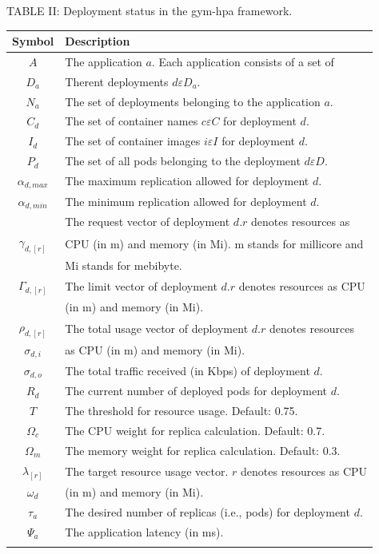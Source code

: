\documentclass[10pt]{article}
\begin{document}
TABLE II: Deployment status in the gym-hpa framework.

\begin{center}
\begin{tabular}{|c|l|}
\hline
Symbol & Description \\
\hline
$A$ & The application $a$. Each application consists of a set of \\
$D_{a}$ & Therent deployments $d \varepsilon D_{a}$. \\
$N_{a}$ & The set of deployments belonging to the application $a$. \\
$C_{d}$ & The set of container names $c \varepsilon C$ for deployment $d$. \\
$I_{d}$ & The set of container images $i \varepsilon I$ for deployment $d$. \\
$P_{d}$ & The set of all pods belonging to the deployment $d \varepsilon D$. \\
$\alpha_{d, m a x}$ & The maximum replication allowed for deployment $d$. \\
$\alpha_{d, m i n}$ & The minimum replication allowed for deployment $d$. \\
 & The request vector of deployment $d . r$ denotes resources as \\
$\gamma_{d,[r]}$ & CPU (in m) and memory (in Mi). m stands for millicore and \\
 & Mi stands for mebibyte. \\
$\Gamma_{d,[r]}$ & The limit vector of deployment $d . r$ denotes resources as CPU \\
 & (in m) and memory (in Mi). \\
$\rho_{d,[r]}$ & The total usage vector of deployment $d . r$ denotes resources \\
$\sigma_{d, i}$ & as CPU (in m) and memory (in Mi). \\
$\sigma_{d, o}$ & The total traffic received (in Kbps) of deployment $d$. \\
$R_{d}$ & The current number of deployed pods for deployment $d$. \\
$T$ & The threshold for resource usage. Default: 0.75. \\
$\Omega_{c}$ & The CPU weight for replica calculation. Default: 0.7. \\
$\Omega_{m}$ & The memory weight for replica calculation. Default: 0.3. \\
$\lambda_{[r]}$ & The target resource usage vector. $r$ denotes resources as CPU \\
$\omega_{d}$ & (in m) and memory (in Mi). \\
$\tau_{a}$ & The desired number of replicas (i.e., pods) for deployment $d$. \\
$\Psi_{a}$ & The application latency (in ms). \\
 &  \\
\end{tabular}
\end{center}
\end{document}
